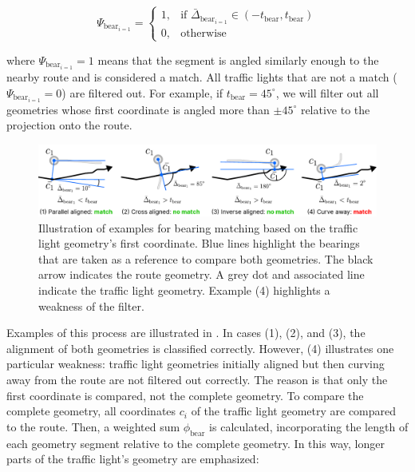 \begin{equation}
\Psi_{\text{bear}_{i=1}} = 
    \begin{cases}
            1,& \text{if } \bar{\Delta}_{\text{bear}_{i=1}} \in \left(-t_{\text{bear}}, t_{\text{bear}}\right)\\
            0,              & \text{otherwise}
        \end{cases}
\end{equation}

where $\Psi_{\text{bear}_{i=1}} = 1$ means that the segment is angled similarly enough to the nearby route and is considered a match. All traffic lights that are not a match ($\Psi_{\text{bear}_{i=1}} = 0$) are filtered out. For example, if $t_{\text{bear}} = 45^{\circ}$, we will filter out all geometries whose first coordinate is angled more than $\pm 45^{\circ}$ relative to the projection onto the route. 

\begin{figure}[t]
\centering
\includegraphics[width=\linewidth]{images/sg-selection-bearing-filter.pdf}
\caption{Illustration of examples for bearing matching based on the traffic light geometry's first coordinate. Blue lines highlight the bearings that are taken as a reference to compare both geometries. The black arrow indicates the route geometry. A grey dot and associated line indicate the traffic light geometry. Example (4) highlights a weakness of the filter.}
\label{fig:sg-selection-bearing-filter}
\end{figure}

Examples of this process are illustrated in . In cases (1), (2), and (3), the alignment of both geometries is classified correctly. However, (4) illustrates one particular weakness: traffic light geometries initially aligned but then curving away from the route are not filtered out correctly. The reason is that only the first coordinate is compared, not the complete geometry. To compare the complete geometry, all coordinates $c_i$ of the traffic light geometry are compared to the route. Then, a weighted sum $\phi_{\text{bear}}$ is calculated, incorporating the length of each geometry segment relative to the complete geometry. In this way, longer parts of the traffic light's geometry are emphasized:

